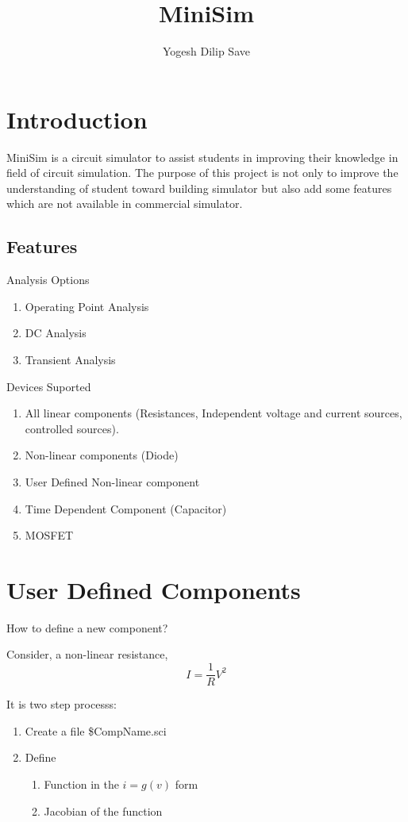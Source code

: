 \documentclass[a4paper,10pt]{report}
\title{MiniSim}
\author{Yogesh Dilip Save}
\begin{document}
\maketitle
\chapter*{Introduction}
MiniSim is a circuit simulator to assist students in improving their knowledge in field of circuit simulation. The purpose of this project is not only to improve the understanding of student toward building simulator but also add some features which are not available in commercial simulator.

\section*{Features}
Analysis Options
\begin{enumerate}
\item Operating Point Analysis
\item DC Analysis
\item Transient Analysis 
\end{enumerate}
Devices Suported
\begin{enumerate}
\item All linear components (Resistances, Independent voltage and current sources, controlled sources).
\item Non-linear components (Diode)
\item User Defined Non-linear component
\item Time Dependent Component (Capacitor)
\item MOSFET
\end{enumerate}

\chapter*{User Defined Components}
How to define a new component?
\par
Consider, a non-linear resistance,
$$I=\frac{1}{R}V^2$$

It is two step processs:
\begin{enumerate}
\item Create  a file \$CompName.sci
\item Define 
\begin{enumerate}
\item Function in the $i=g(v)$ form
\item Jacobian of the function 
\end{enumerate}
\end{enumerate}
\end{document}
